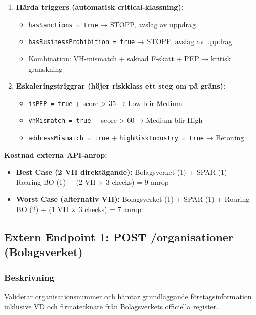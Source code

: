 \documentclass[12pt,a4paper]{article}
\begin{document}
\begin{enumerate}[noitemsep]
  \item \textbf{Hårda triggers (automatisk critical-klassning):}
    \begin{itemize}[noitemsep]
      \item \texttt{hasSanctions = true} → STOPP, avslag av uppdrag
      \item \texttt{hasBusinessProhibition = true} → STOPP, avslag av uppdrag
      \item Kombination: VH-mismatch + saknad F-skatt + PEP → kritisk granskning
    \end{itemize}
  
  \item \textbf{Eskaleringstriggrar (höjer riskklass ett steg om på gräns):}
    \begin{itemize}[noitemsep]
      \item \texttt{isPEP = true} + score > 35 → Low blir Medium
      \item \texttt{vhMismatch = true} + score > 60 → Medium blir High
      \item \texttt{addressMismatch = true} + \texttt{highRiskIndustry = true} → Betoning
    \end{itemize}
\end{enumerate}

\textbf{Kostnad externa API-anrop:}
\begin{itemize}[noitemsep]
  \item \textbf{Best Case (2 VH direktägande):} Bolagsverket (1) + SPAR (1) + Roaring BO (1) + (2 VH × 3 checks) = 9 anrop
  \item \textbf{Worst Case (alternativ VH):} Bolagsverket (1) + SPAR (1) + Roaring BO (2) + (1 VH × 3 checks) = 7 anrop
\end{itemize}

\subsection{Extern Endpoint 1: POST /organisationer (Bolagsverket)}

\subsubsection{Beskrivning}

Validerar organisationsnummer och hämtar grundläggande företagsinformation inklusive VD och firmatecknare från Bolagsverkets officiella register.
\end{document}
